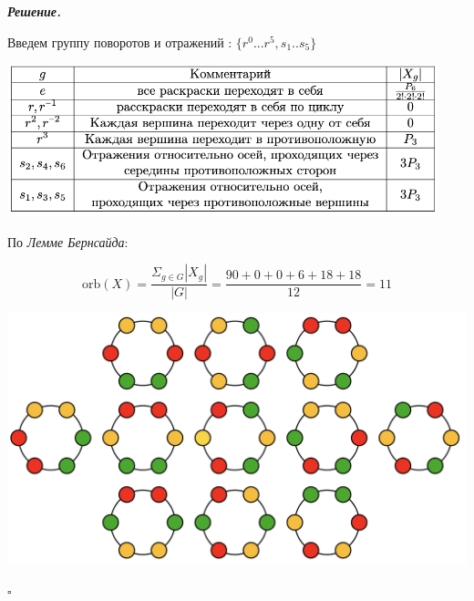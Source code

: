 \documentclass[12pt]{article}
\newenvironment{solution}[1][\it{Решение}]{\textbf{#1. } }{$\square$}
\begin{document}
\begin{solution}

Введем группу поворотов и отражений : $\{r^0 ... r^5, s_1 .. s_5\}$
\begin{center}
    \includegraphics[width = 12.5cm]{Снимок экрана 2024-03-19 в 18.57.01.png}
\end{center}


По \textit{Лемме Бернсайда}: 

$$
\text{orb}(X) = \frac{\Sigma_{g \in G} |X_g|}{|G|} = \frac{90 + 0 + 0 + 6 + 18 + 18}{12} = 11
$$
\begin{center}
    \includegraphics[width = 7 cm]{Снимок экрана 2024-03-19 в 18.52.29.png}
\end{center}
\end{solution}
\end{document}
